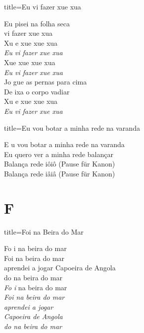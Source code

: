 \documentclass[fontsize=14pt, paper=a4, twoside, DIV=20]{scrreprt} %
\newcommand\chapTOC[1]{
    \chapter*{#1}
    \addcontentsline{toc}{chapter}{#1}
    \markboth{#1}{#1}}
\begin{document}
\begin{multicols*}{2}
\begin{song}{title={Eu vi fazer xue xua }}
        \begin{verse*}
            Eu pisei na folha seca\\
            vi fazer xue xua\\
            Xu e xue xue xua\\
            \textit{Eu} \textit{vi fazer xue xua}\\
            Xue xue xue xua\\
            \textit{Eu vi fazer xue xua}\\
            Jo gue as pernas para cima\\
            De ixa o corpo vadiar\\
            Xu e xue xue xua\\
            \textit{Eu} \textit{vi fazer xue xua}\\
        \end{verse*}
\end{song}

\begin{song}{title={Eu vou botar a minha rede na varanda}}
        \begin{verse*}
            E u vou botar a minha rede na varanda\\
            Eu quero ver a minha rede balançar\\
            Balança rede iôiô (Pause für Kanon)\\
            Balança rede iâiâ (Pause für Kanon)\\
        \end{verse*}
\end{song}

\chapTOC{F}

\begin{song}{title={Foi na Beira do Mar}}
        \begin{verse*}
            Fo i na beira do mar\\
            Foi na beira do mar\\
            aprendei a jogar Capoeira de Angola\\
            do na beira do mar\\

            \textit{Fo} \textit{i} na beira do mar\\
             \textit{Foi na beira do mar\\}
            \textit{aprendei a jogar \\
            Capoeira de Angola \\
            do na beira do mar\\}
        \end{verse*}
\end{song}


\end{multicols*}
\end{document}
